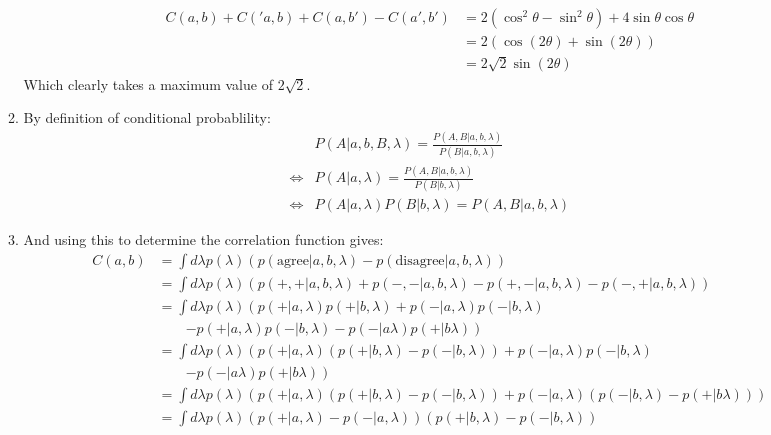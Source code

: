 \documentclass[12pt,a4]{article}
\begin{document}
\begin{enumerate}
\begin{enumerate}
        \begin{align*}
          C(a,b) + C('a,b) + C(a,b') - C(a',b') &= 2(\cos^2\theta - \sin^2 \theta) + 4 \sin \theta \cos \theta\\
                                                &= 2 (\cos (2 \theta) + \sin (2\theta)) \\
                                                &= 2 \sqrt{2} \sin(2 \theta)
        \end{align*}
        Which clearly takes a maximum value of $2 \sqrt{2}$.
      \item
        By definition of conditional probablility:
        \begin{align*}
                           & P(A | a, b, B, \lambda) =\frac{ P(A, B | a, b , \lambda)}{P(B | a, b, \lambda)} \\
           \Leftrightarrow & P(A | a, \lambda) = \frac{ P(A, B | a, b, \lambda)}{P(B |b, \lambda)} \\
           \Leftrightarrow & P(A | a, \lambda) P(B |b, \lambda) = P(A, B | a, b, \lambda)
        \end{align*}
      \item
        And using this to determine the correlation function gives:
        \begin{align*}
          C(a,b) &= \int d\lambda p(\lambda) (p(\text{agree} | a, b, \lambda) - p(\text{disagree} | a, b, \lambda))\\
                 &= \int d\lambda p(\lambda) (p(+, + | a, b, \lambda) + p(-, - | a, b, \lambda) - p(+, -| a, b, \lambda) - p(-, +| a, b, \lambda))\\
                 &= \int d\lambda p(\lambda) \left(p(+| a, \lambda)p(+|b, \lambda) + p(-| a,\lambda)p(-| b,\lambda) \right.\\
                 & \qquad \left. - p(+| a, \lambda)p(- | b, \lambda) - p(- | a \lambda)p(+ | b \lambda)\right)\\
                 &= \int d\lambda p(\lambda) \left(p(+| a, \lambda)(p(+|b, \lambda) - p(- | b, \lambda)) + p(-| a,\lambda)p(-| b,\lambda) \right.\\
                 & \qquad \left.  - p(- | a \lambda)p(+ | b \lambda)\right)\\
                 &= \int d\lambda p(\lambda) \left(p(+| a, \lambda)(p(+|b, \lambda) - p(- | b, \lambda)) + p(-| a,\lambda)(p(-| b,\lambda) - p(+ | b \lambda))\right)\\
                 &= \int d\lambda p(\lambda) (p(+| a, \lambda) - p(-| a,\lambda))(p(+|b, \lambda) - p(- | b, \lambda))  

\end{align*}
\end{enumerate}
\end{enumerate}
\end{document}
